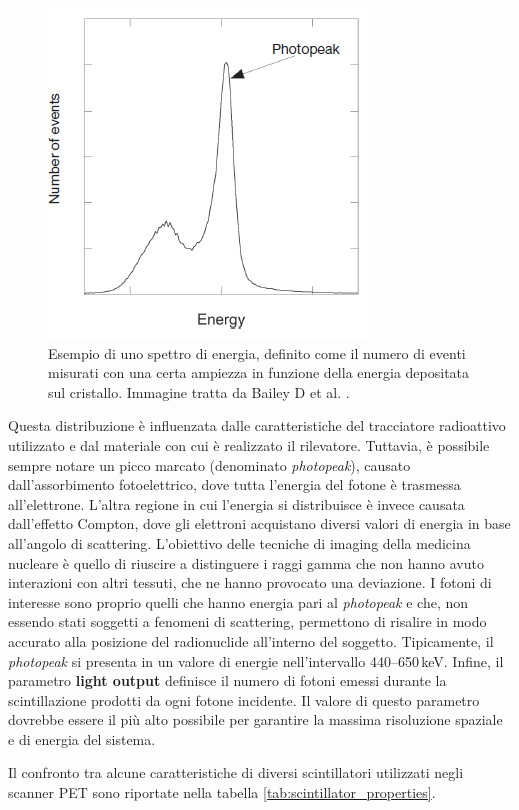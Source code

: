 \begin{figure}[h!]
	\centering
	\includegraphics[width=0.38\linewidth]{./ImageFiles/Photo peak.jpg}
	\caption{Esempio di uno spettro di energia, definito come il numero di eventi misurati con una certa ampiezza in funzione della energia depositata sul cristallo. Immagine tratta da Bailey D et al. \cite{Bailey2014}.}
	\label{fig:photo_peak}
\end{figure}
Questa distribuzione è influenzata dalle caratteristiche del tracciatore radioattivo utilizzato e dal materiale con cui è realizzato il rilevatore. Tuttavia, è possibile sempre notare un picco marcato (denominato \textit{photopeak}), causato dall'assorbimento fotoelettrico, dove tutta l'energia del fotone è trasmessa all'elettrone. L'altra regione in cui l'energia si distribuisce è invece causata dall'effetto Compton, dove gli elettroni acquistano diversi valori di energia in base all'angolo di scattering. L'obiettivo delle tecniche di imaging della medicina nucleare è quello di riuscire a distinguere i raggi gamma che non hanno avuto interazioni con altri tessuti, che ne hanno provocato una deviazione. I fotoni di interesse sono proprio quelli che hanno energia pari al \textit{photopeak} e che, non essendo stati soggetti a fenomeni di scattering, permettono di risalire in modo accurato alla posizione del radionuclide all'interno del soggetto. Tipicamente, il \textit{photopeak} si presenta in un valore di energie nell'intervallo \numrange[range-phrase=--]{440}{650}\,\unit{\kilo\electronvolt}. Infine, il parametro \textbf{light output} definisce il numero di fotoni emessi durante la scintillazione prodotti da ogni fotone incidente. Il valore di questo parametro dovrebbe essere il più alto possibile per garantire la massima risoluzione spaziale e di energia del sistema.

\noindent
Il confronto tra alcune caratteristiche di diversi scintillatori utilizzati negli scanner PET sono riportate nella tabella \ref{tab:scintillator_properties}.

